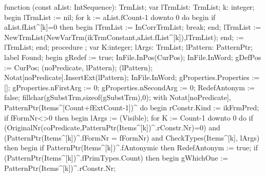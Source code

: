 function (const aList: IntSequence): TrmList;
var
   lTrmList: TrmList;
   k: integer;
begin
   lTrmList := nil;
   for k := aList.fCount-1 downto 0 do
   begin
      if aList.fList^[k]=0 then
      begin
         lTrmList := InCorrTrmList;
         break;
      end;
      lTrmList := NewTrmList(NewVarTrm(ikTrmConstant,aList.fList^[k]),lTrmList);
   end;
    := lTrmList;
end;
\eatline
{}\nwendcode{}\nwdocspar
\nwenddocs{}\endmoddef\nwstartdeflinemarkup{}\nwenddeflinemarkup
procedure ;
var
   K:integer;
   lArgs: TrmList;
   lPattern: PatternPtr;
label Found;
begin
   gRedef := true;
   InFile.InPos(CurPos);
   InFile.InWord;
   gDefPos := CurPos;
   (noPredicate, lPattern);
   (lPattern);
   Notat[noPredicate].InsertExt(lPattern);
   InFile.InWord;
   gProperties.Properties := [];
   gProperties.nFirstArg := 0;
   gProperties.nSecondArg := 0;
   RedefAntonym := false;
   fillchar(gSubstTrm,sizeof(gSubstTrm),0);
   with Notat[noPredicate], PatternPtr(Items^[Count+fExtCount-1])^ do
   begin
      rConstr.Kind := ikFrmPred;
      if fFormNr<>0 then
      begin
         lArgs := (Visible);
         for K := Count-1 downto 0 do
            if (OriginalNr(coPredicate,PatternPtr(Items^[k])^.rConstr.Nr)=0) and
                  (PatternPtr(Items^[k])^.fFormNr = fFormNr) and
                  CheckTypes(Items^[k], lArgs)
            then
            begin
               if PatternPtr(Items^[k])^.fAntonymic then RedefAntonym := true;
               if (PatternPtr(Items^[k])^.fPrimTypes.Count) then
               begin
                  gWhichOne := PatternPtr(Items^[k])^.rConstr.Nr;
